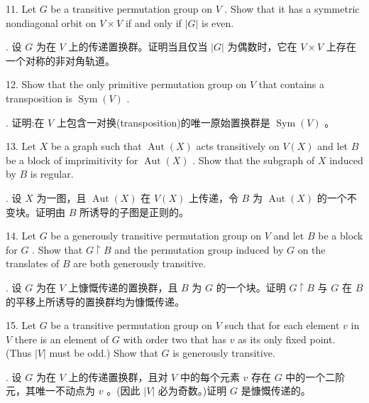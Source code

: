 \documentclass[10pt]{article}
\begin{document}
11. Let \(G\) be a transitive permutation group on \(V\) . Show that it has a symmetric nondiagonal orbit on \(V \times  V\) if and only if \(\left| G\right|\) is even.

\begin{tcolorbox}. 设 \(G\) 为在 \(V\) 上的传递置换群。证明当且仅当 \(\left| G\right|\) 为偶数时，它在 \(V \times  V\) 上存在一个对称的非对角轨道。
\end{tcolorbox}

12. Show that the only primitive permutation group on \(V\) that contains a transposition is \(\operatorname{Sym}\left( V\right)\) .

\begin{tcolorbox}. 证明:在 \(V\) 上包含一对换(transposition)的唯一原始置换群是 \(\operatorname{Sym}\left( V\right)\) 。
\end{tcolorbox}

13. Let \(X\) be a graph such that \(\operatorname{Aut}\left( X\right)\) acts transitively on \(V\left( X\right)\) and let \(B\) be a block of imprimitivity for \(\operatorname{Aut}\left( X\right)\) . Show that the subgraph of \(X\) induced by \(B\) is regular.

\begin{tcolorbox}. 设 \(X\) 为一图，且 \(\operatorname{Aut}\left( X\right)\) 在 \(V\left( X\right)\) 上传递，令 \(B\) 为 \(\operatorname{Aut}\left( X\right)\) 的一个不变块。证明由 \(B\) 所诱导的子图是正则的。
\end{tcolorbox}

14. Let \(G\) be a generously transitive permutation group on \(V\) and let \(B\) be a block for \(G\) . Show that \(G \upharpoonright  B\) and the permutation group induced by \(G\) on the translates of \(B\) are both generously transitive.

\begin{tcolorbox}. 设 \(G\) 为在 \(V\) 上慷慨传递的置换群，且 \(B\) 为 \(G\) 的一个块。证明 \(G \upharpoonright  B\) 与 \(G\) 在 \(B\) 的平移上所诱导的置换群均为慷慨传递。
\end{tcolorbox}

15. Let \(G\) be a transitive permutation group on \(V\) such that for each element \(v\) in \(V\) there is an element of \(G\) with order two that has \(v\) as its only fixed point. (Thus \(\left| V\right|\) must be odd.) Show that \(G\) is generously transitive.

\begin{tcolorbox}. 设 \(G\) 为在 \(V\) 上的传递置换群，且对 \(V\) 中的每个元素 \(v\) 存在 \(G\) 中的一个二阶元，其唯一不动点为 \(v\) 。(因此 \(\left| V\right|\) 必为奇数。)证明 \(G\) 是慷慨传递的。
\end{tcolorbox}
\end{document}
